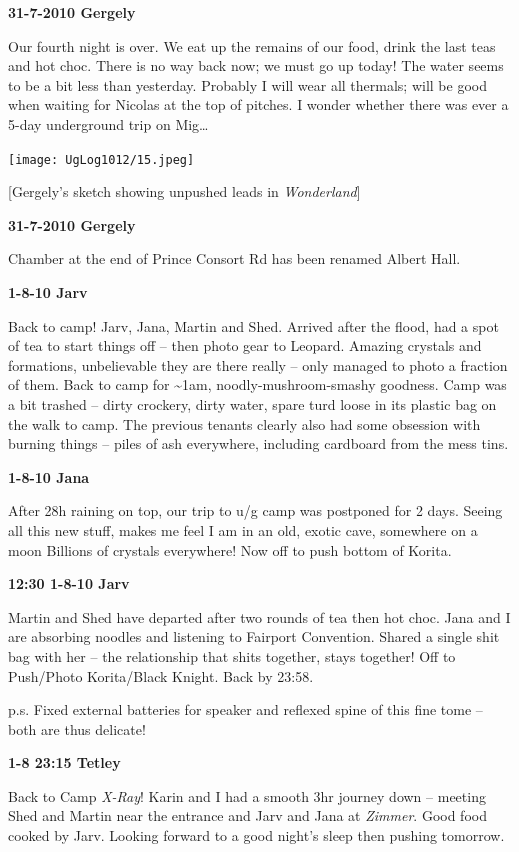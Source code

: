 \textbf{31-7-2010 Gergely}

Our fourth night is over. We eat up the remains of our food, drink the
last teas and hot choc. There is no way back now; we must go up today!
The water seems to be a bit less than yesterday. Probably I will wear
all thermals; will be good when waiting for Nicolas at the top of
pitches. I wonder whether there was ever a 5-day underground trip on
Mig\ldots{}

\texttt{[image: UgLog1012/15.jpeg]}

{[}Gergely's sketch showing unpushed leads in \emph{Wonderland}{]}

\textbf{31-7-2010 Gergely}

Chamber at the end of Prince Consort Rd has been renamed Albert Hall.

\textbf{1-8-10 Jarv}

Back to camp! Jarv, Jana, Martin and Shed. Arrived after the flood, had
a spot of tea to start things off -- then photo gear to Leopard. Amazing
crystals and formations, unbelievable they are there really -- only
managed to photo a fraction of them. Back to camp for
\textasciitilde{}1am, noodly-mushroom-smashy goodness. Camp was a bit
trashed -- dirty crockery, dirty water, spare turd loose in its plastic
bag on the walk to camp. The previous tenants clearly also had some
obsession with burning things -- piles of ash everywhere, including
cardboard from the mess tins.

\textbf{1-8-10 Jana}

After 28h raining on top, our trip to u/g camp was postponed for 2 days.
Seeing all this new stuff, makes me feel I am in an old, exotic cave,
somewhere on a moon Billions of crystals everywhere! Now off to push
bottom of Korita.

\textbf{12:30 1-8-10 Jarv}

Martin and Shed have departed after two rounds of tea then hot choc.
Jana and I are absorbing noodles and listening to Fairport Convention.
Shared a single shit bag with her -- the relationship that shits
together, stays together! Off to Push/Photo Korita/Black Knight. Back by
23:58.

p.s. Fixed external batteries for speaker and reflexed spine of this
fine tome -- both are thus delicate!

\textbf{1-8 23:15 Tetley}

Back to Camp \emph{X-Ray}! Karin and I had a smooth 3hr journey down --
meeting Shed and Martin near the entrance and Jarv and Jana at
\emph{Zimmer}. Good food cooked by Jarv. Looking forward to a good
night's sleep then pushing tomorrow.

